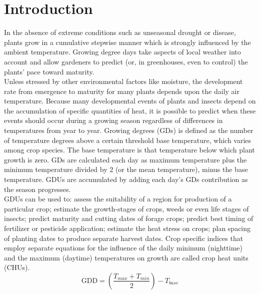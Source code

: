 \documentclass[12pt,letterpaper]{article}
\begin{document}
\section{Introduction}
In the absence of extreme conditions such as unseasonal drought or disease, plants grow in a cumulative stepwise manner which is strongly influenced by the ambient temperature. Growing degree days take aspects of local weather into account and allow gardeners to predict (or, in greenhouses, even to control) the plants' pace toward maturity.\\
Unless stressed by other environmental factors like moisture, the development rate from emergence to maturity for many plants depends upon the daily air temperature. Because many developmental events of plants and insects depend on the accumulation of specific quantities of heat, it is possible to predict when these events should occur during a growing season regardless of differences in temperatures from year to year. Growing degrees (GDs) is defined as the number of temperature degrees above a certain threshold base temperature, which varies among crop species. The base temperature is that temperature below which plant growth is zero. GDs are calculated each day as maximum temperature plus the minimum temperature divided by 2 (or the mean temperature), minus the base temperature. GDUs are accumulated by adding each day's GDs contribution as the season progresses.\\
GDUs can be used to: assess the suitability of a region for production of a particular crop; estimate the growth-stages of crops, weeds or even life stages of insects; predict maturity and cutting dates of forage crops; predict best timing of fertilizer or pesticide application; estimate the heat stress on crops; plan spacing of planting dates to produce separate harvest dates. Crop specific indices that employ separate equations for the influence of the daily minimum (nighttime) and the maximum (daytime) temperatures on growth are called crop heat units (CHUs).
\begin{equation}
\textrm{GDD} = \left(\frac{T_{max} + T_{min}}{2}\right) - T_{base}
\label{eqn:gdd}
\end{equation}
\end{document}
